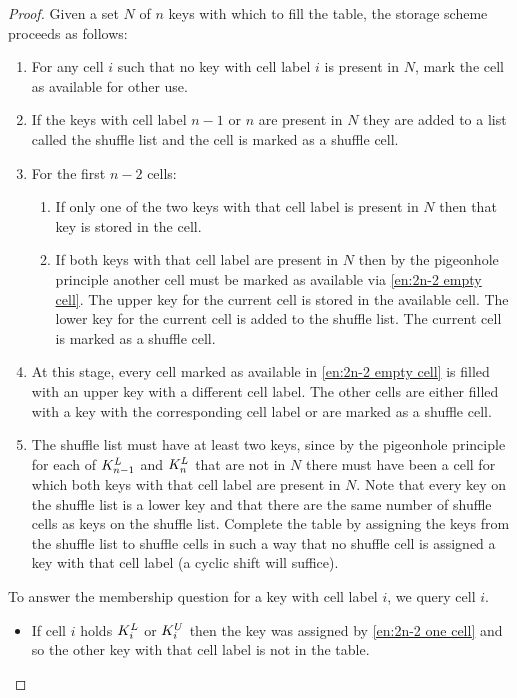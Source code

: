 \begin{proof}
Given a set $N$ of $n$ keys with which to fill the table, the storage scheme proceeds as follows:
	\begin{enumerate}
		\item\label{en:2n-2 empty cell} For any cell $i$ such that no key with cell label $i$ is present in $N$, mark the cell as available for other use.
		\item\label{en:2n-2 end cell} If the keys with cell label $n-1$ or $n$ are present in $N$ they are added to a list called the shuffle list and the cell is marked as a shuffle cell.
		\item For the first $n-2$ cells:
			\begin{enumerate}
				\item\label{en:2n-2 one cell} If only one of the two keys with that cell label is present in $N$ then that key is stored in the cell.
				\item\label{en:2n-2 two cell} If both keys with that cell label are present in $N$ then by the pigeonhole principle another cell must be marked as available via \ref{en:2n-2 empty cell}. The upper key for the current cell is stored in the available cell. The lower key for the current cell is added to the shuffle list. The current cell is marked as a shuffle cell.
			\end{enumerate}
		\item At this stage, every cell marked as available in \ref{en:2n-2 empty cell} is filled with an upper key with a different cell label. The other cells are either filled with a key with the corresponding cell label or are marked as a shuffle cell.
		\item\label{en:2n-2 shuffle} The shuffle list must have at least two keys, since by the pigeonhole principle for each of $K_{n-1}^{L}$ and $K_{n}^{L}$ that are not in $N$ there must have been a cell for which both keys with that cell label are present in $N$. Note that every key on the shuffle list is a lower key and that there are the same number of shuffle cells as keys on the shuffle list. Complete the table by assigning the keys from the shuffle list to shuffle cells in such a way that no shuffle cell is assigned a key with that cell label (a cyclic shift will suffice).
	\end{enumerate}
To answer the membership question for a key with cell label $i$, we query cell $i$.
	\begin{itemize}
		\item If cell $i$ holds $K_{i}^{L}$ or $K_{i}^{U}$ then the key was assigned by \ref{en:2n-2 one cell} and so the other key with that cell label is not in the table.

\end{itemize}
\end{proof}
